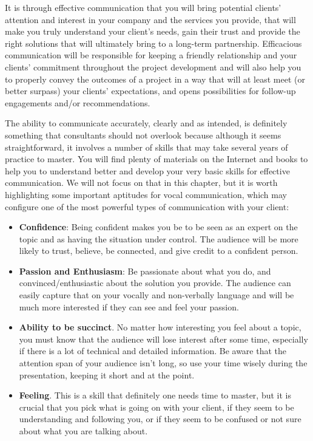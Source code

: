\documentclass[
]{krantz}
\providecommand{\tightlist}{%
  \setlength{\itemsep}{0pt}\setlength{\parskip}{0pt}}
\begin{document}
It is through effective communication that you will bring potential clients' attention and interest in your company and the services you provide, that will make you truly understand your client's needs, gain their trust and provide the right solutions that will ultimately bring to a long-term partnership. Efficacious communication will be responsible for keeping a friendly relationship and your clients' commitment throughout the project development and will also help you to properly convey the outcomes of a project in a way that will at least meet (or better surpass) your clients' expectations, and opens possibilities for follow-up engagements and/or recommendations.

The ability to communicate accurately, clearly and as intended, is definitely something that consultants should not overlook because although it seems straightforward, it involves a number of skills that may take several years of practice to master. You will find plenty of materials on the Internet and books to help you to understand better and develop your very basic skills for effective communication. We will not focus on that in this chapter, but it is worth highlighting some important aptitudes for vocal communication, which may configure one of the most powerful types of communication with your client:

\begin{itemize}
\tightlist
\item
  \textbf{Confidence}: Being confident makes you be to be seen as an expert on the topic and as having the situation under control. The audience will be more likely to trust, believe, be connected, and give credit to a confident person.
\item
  \textbf{Passion and Enthusiasm}: Be passionate about what you do, and convinced/enthusiastic about the solution you provide. The audience can easily capture that on your vocally and non-verbally language and will be much more interested if they can see and feel your passion.
\item
  \textbf{Ability to be succinct}. No matter how interesting you feel about a topic, you must know that the audience will lose interest after some time, especially if there is a lot of technical and detailed information. Be aware that the attention span of your audience isn't long, so use your time wisely during the presentation, keeping it short and at the point.
\item
  \textbf{Feeling}. This is a skill that definitely one needs time to master, but it is crucial that you pick what is going on with your client, if they seem to be understanding and following you, or if they seem to be confused or not sure about what you are talking about.
\end{itemize}
\end{document}
